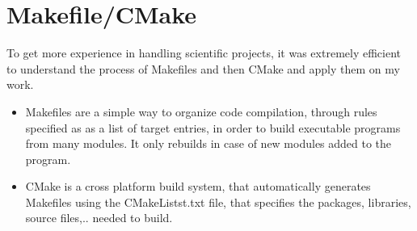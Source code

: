 \section{Makefile/CMake}
To get more experience in handling scientific projects, it was extremely efficient to understand the process of Makefiles and then CMake and apply them on my work. 
\begin{itemize}
\item Makefiles are a simple way to organize code compilation, through rules specified as as a list of target entries, in order to build executable programs from many modules. It only rebuilds in case of new modules added to the program.
\item CMake is a cross platform build system, that automatically generates Makefiles using the CMakeListst.txt file, that specifies the packages, libraries, source files,.. needed to build.
\end{itemize}  
